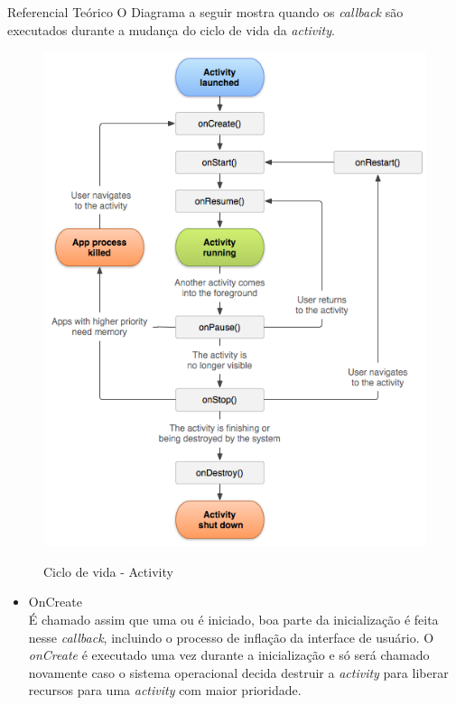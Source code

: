 \documentclass[
	12pt,				%
	openany,			%
	twoside,			%
	a4paper,			%
	english,			%
	french,				%
	spanish,			%
	brazil				%
	]{abntex2}
\begin{document}
\begin{chapter}{Referencial Teórico}
O Diagrama a seguir mostra quando os \textit{callback} são executados durante a mudança do ciclo de vida da \textit{activity}.
\begin{figure}[h]
\centering
   \caption{Ciclo de vida - Activity}
   \includegraphics[scale=0.70]{media/activity_lifecycle.png}
     \label{fig:lifecycle}
\end{figure}

\newpage
\begin{itemize}
\item{OnCreate} \\
     É chamado assim que uma  ou  é iniciado, boa parte da inicialização é feita nesse \textit{callback}, incluindo o processo de inflação da interface de usuário. O \textit{onCreate} é executado uma vez durante a inicialização e só será chamado novamente caso o sistema operacional decida destruir a \textit{activity} para liberar recursos para uma \textit{activity} com maior prioridade.
     

\end{itemize}
\end{chapter}
\end{document}
